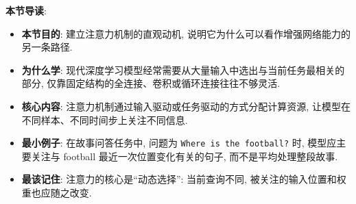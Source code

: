 \documentclass{../nndlcourse}
\begin{document}
\textbf{本节导读}:
\begin{itemize}
  \item \textbf{本节目的}: 建立注意力机制的直观动机, 说明它为什么可以看作增强网络能力的另一条路径.
  \item \textbf{为什么学}: 现代深度学习模型经常需要从大量输入中选出与当前任务最相关的部分, 仅靠固定结构的全连接、卷积或循环连接往往不够灵活.
  \item \textbf{核心内容}: 注意力机制通过输入驱动或任务驱动的方式分配计算资源, 让模型在不同样本、不同时间步上关注不同信息.
  \item \textbf{最小例子}: 在故事问答任务中, 问题为 \texttt{Where is the football?} 时, 模型应主要关注与 football 最近一次位置变化有关的句子, 而不是平均处理整段故事.
  \item \textbf{最该记住}: 注意力的核心是“动态选择”: 当前查询不同, 被关注的输入位置和权重也应随之改变.
\end{itemize}
\end{document}
